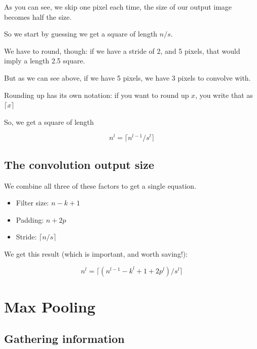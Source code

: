         As you can see, we skip one pixel each time, the size of our output image becomes half the size.
        
        So we start by guessing we get a square of length $n/s$.
        
        We have to round, though: if we have a stride of 2, and 5 pixels, that would imply a length 2.5 square.
        
        But as we can see above, if we have 5 pixels, we have 3 pixels to convolve with.
        
        Rounding up has its own notation: if you want to round up $x$, you write that as $\lceil x \rceil$
        
        So, we get a square of length 
        
        \begin{equation*}
            n^{l} =\lceil n^{l-1}/s^l \rceil
        \end{equation*}
    
    \subsection{The convolution output size}
    
        We combine all three of these factors to get a single equation.
        
        \begin{itemize}
            \item Filter size: $n-k+1$
            \item Padding: $n+2p$
            \item Stride: $\lceil n/s \rceil$
        \end{itemize}
        
        We get this result (which is important, and worth saving!):
        
        \begin{equation*}
            n^{l} = \lceil ( n^{l-1} - k^l + 1 + 2p^l)/s^l \rceil
        \end{equation*}
        
        
        

\section{Max Pooling}

    \subsection{Gathering information}
    
